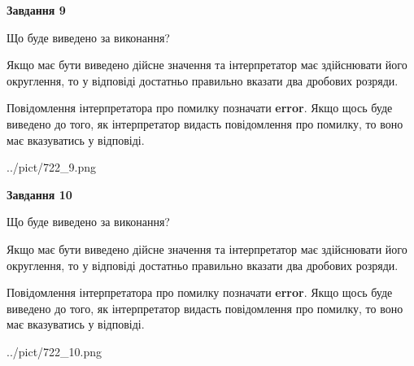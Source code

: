\documentclass[12pt, ukrainian]{article}
\begin{document}
{\begin {Large}
{\begin {center}\textbf{Завдання 9}\end {center}}\par
Що буде виведено за виконання? \par

Якщо має бути виведено дійсне значення та інтерпретатор має здійснювати його округлення, 
то у відповіді достатньо правильно вказати два дробових розряди.

Повідомлення інтерпретатора про помилку позначати \textbf{error}.
Якщо щось буде виведено до того, як інтерпретатор видасть повідомлення про помилку, 
то воно має вказуватись у відповіді. \par

\begin{center}
	{../pict/722_9.png}
\end{center}
\newpage

{\begin {center}\textbf{Завдання 10}\end {center}}\par
Що буде виведено за виконання? \par

Якщо має бути виведено дійсне значення та інтерпретатор має здійснювати його округлення, 
то у відповіді достатньо правильно вказати два дробових розряди.

Повідомлення інтерпретатора про помилку позначати \textbf{error}.
Якщо щось буде виведено до того, як інтерпретатор видасть повідомлення про помилку, 
то воно має вказуватись у відповіді. \par

\begin{center}
	{../pict/722_10.png}
\end{center}
\newpage

\end {Large}}
\end{document}
